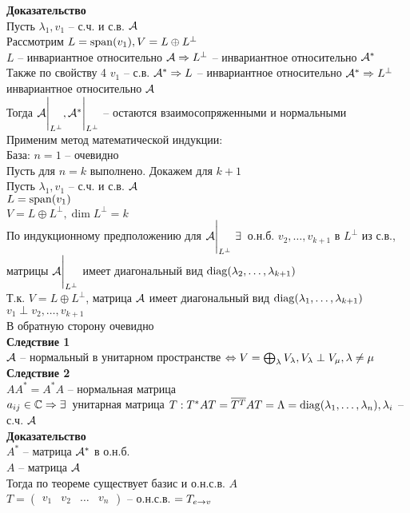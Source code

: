 \documentclass[12pt]{article}
\begin{document}
\textbf{Доказательство}\\
Пусть $ \lambda_1, v_1$ -- с.ч. и с.в. $\mathcal{A}$\\
Рассмотрим $L = \operatorname{span}(v_1), V = L \oplus L^\perp$\\
$L$ -- инвариантное относительно $\mathcal{A} \Rightarrow L^\perp$ -- инвариантное относительно $\mathcal{A}^*$\\
Также по свойству 4 $v_1$ -- с.в. $\mathcal{A}^* \Rightarrow L$ -- инвариантное относительно $\mathcal{A}^* \Rightarrow L^\perp$ инвариантное относительно $\mathcal{A}$\\
Тогда $\mathcal{A} \Biggr|_{L^\perp}, \mathcal{A}^* \Biggr|_{L^\perp}$ -- остаются взаимосопряженными и нормальными\\
Применим метод математической индукции:\\
База: $n = 1$ -- очевидно\\
Пусть для $n = k$ выполнено. Докажем для $k+1$\\
Пусть $ \lambda_1, v_1$ -- с.ч. и с.в. $\mathcal{A}$\\
$L = \operatorname{span}(v_1)$\\
$V = L \oplus L^\perp, \dim L^\perp = k$\\
По индукционному предположению для $\mathcal{A}\Biggr|_{L^\perp}\ \exists\,$ о.н.б. $v_2, \ldots, v_{k+1}$ в $L^\perp$ из с.в., матрицы $\mathcal{A}\Biggr|_{L^\perp}$ имеет диагональный вид $\operatorname{diag}( \lambda_2, \ldots, \lambda_{k+1})$\\
Т.к. $V = L\oplus L^\perp$, матрица $\mathcal{A}$ имеет диагональный вид $\operatorname{diag}( \lambda_1, \ldots, \lambda_{k+1})$\\
$v_1 \perp v_2, \ldots, v_{k+1}$\\
В обратную сторону очевидно\\
\textbf{Следствие 1}\\
$\mathcal{A}$ -- нормальный в унитарном пространстве $\Leftrightarrow V = \bigoplus_{ \lambda}V_\lambda, V_\lambda \perp V_\mu, \lambda \neq \mu$\\
\textbf{Следствие 2}\\
$AA^* = A^*A$ -- нормальная матрица\\
$a_{ij} \in \mathbb{C} \Rightarrow \exists\,$ унитарная матрица $T: T^*AT = \overline{T^T}AT = \Lambda = \operatorname{diag}( \lambda_1, \ldots, \lambda_n), \lambda_i$ -- с.ч. $\mathcal{A}$\\
\textbf{Доказательство}\\
$A^*$ -- матрица $\mathcal{A}^*$ в о.н.б.\\
$A$ -- матрица $\mathcal{A}$\\
Тогда по теореме существует базис и о.н.с.в. $A$\\
$T = \begin{pmatrix}
    v_1 & v_2 & \ldots & v_n
\end{pmatrix}$ -- о.н.с.в. $= T_{e\rightarrow v}$\\
\end{document}
